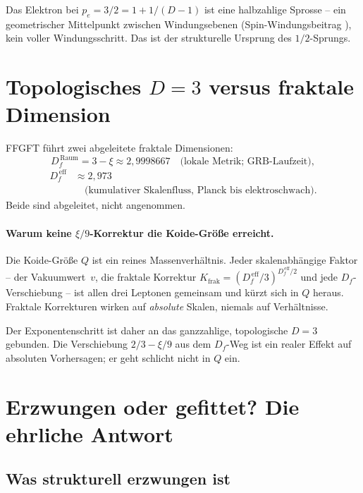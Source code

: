 Das Elektron bei \(p_e = 3/2 = 1 + 1/(D-1)\) ist eine halbzahlige
Sprosse -- ein geometrischer Mittelpunkt zwischen Windungsebenen
(Spin-Windungsbeitrag \cite{PascherDok051}), kein voller Windungsschritt. Das ist der
strukturelle Ursprung des \(1/2\)-Sprungs.

\section{Topologisches \(D=3\) versus fraktale Dimension}
\label{sec:df}

FFGFT führt zwei abgeleitete fraktale Dimensionen:
\begin{equation}
  D_f^{\,\text{Raum}} = 3 - \xi \approx 2{,}9998667
  \quad\text{(lokale Metrik; GRB-Laufzeit)},
\end{equation}
\begin{align*}
  D_f^{\,\text{eff}} &\approx 2{,}973\\
  &\quad\text{(kumulativer Skalenfluss, Planck bis elektroschwach)}.
\end{align*}
Beide sind abgeleitet, nicht angenommen.

\paragraph{Warum keine \(\xi/9\)-Korrektur die Koide-Größe erreicht.}
Die Koide-Größe \(Q\) ist ein reines Massenverhältnis.
Jeder skalenabhängige Faktor --
der Vakuumwert~\(v\),
die fraktale Korrektur
\(K_{\text{frak}} = (D_f^{\,\text{eff}}/3)^{D_f^{\,\text{eff}}/2}\)
und jede \(D_f\)-Verschiebung --
ist allen drei Leptonen gemeinsam und kürzt sich in \(Q\) heraus.
Fraktale Korrekturen wirken auf \emph{absolute} Skalen, niemals auf
Verhältnisse.

Der Exponentenschritt ist daher an das ganzzahlige, topologische
\(D=3\) gebunden. Die Verschiebung \(2/3 - \xi/9\) aus dem
\(D_f\)-Weg ist ein realer Effekt auf absoluten Vorhersagen;
er geht schlicht nicht in \(Q\) ein.

\section{Erzwungen oder gefittet? Die ehrliche Antwort}

\subsection*{Was strukturell erzwungen ist}

